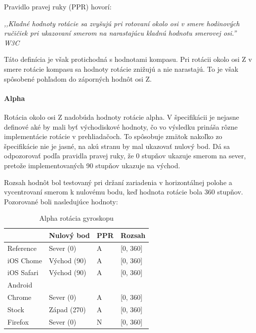 Pravidlo pravej ruky (PPR) hovorí: 

\begin{fancybox}
\textit{,,Kladné hodnoty rotácie sa zvyšujú pri rotovaní okolo osi v smere hodinových ručičiek pri ukazovaní smerom na narastajúcu kladnú hodnotu smerovej osi.'' W3C \cite{deviceorientation}}
\end{fancybox}


Táto definícia je však protichodná s hodnotami kompasu. Pri rotácii okolo osi Z v smere rotácie kompasu sa hodnoty rotácie znižujú a nie narastajú. To je však spôsobené pohľadom do záporných hodnôt osi Z.


\paragraph{Alpha} %
\label{par:alpha}

Rotácia okolo osi Z nadobúda hodnoty rotácie alpha. V špecifikácii je nejasne definové aké by mali byť východiskové hodnoty, čo vo výsledku prináša rôzne implementácie rotácie v prehliadačoch. To spôsobuje zmätok nakoľko zo špecifikácie nie je jasné, na akú stranu by mal ukazovať nulový bod. Dá sa odpozorovať podľa pravidla pravej ruky, že 0 stupňov ukazuje smerom na sever, pretože implementovaných 90 stupňov ukazuje na východ.

Rozsah hodnôt bol testovaný pri držaní zariadenia v horizontálnej polohe a vycentrovaní smerom k nulovému bodu, keď hodnota rotácie bola 360 stupňov. Pozorované boli nasledujúce hodnoty:

\begin{table}[H]
  \begin{tabular}{ | l | l | l | l |}
  \hline
              & Nulový bod  & PPR   & Rozsah \\ \hline
  Reference   & Sever (0)   & A     & [0, 360] \\  
  iOS Chome   & Východ (90)   & A     & [0, 360] \\  
  iOS Safari  & Východ (90)   & A     & [0, 360] \\  
  Android & & & \\  
  Chrome      & Sever (0)   & A     & [0, 360] \\  
  Stock       & Západ (270)  & A     & [0, 360] \\  
  Firefox     & Sever (0)   & N     & [0, 360] \\
  \hline
  \end{tabular}
  \caption[Alpha rotácia gyroskopu]{Alpha rotácia gyroskopu}
\end{table}

